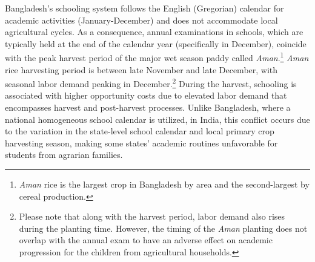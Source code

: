 \documentclass[12pt,letterpaper]{article}
\newcommand{\0}{\ensuremath{\mbox{\boldmath $0$}}}
\begin{document}
Bangladesh's schooling system follows the English (Gregorian) calendar for academic activities (January-December) and does not accommodate local agricultural cycles. As a consequence, annual examinations in schools, which are typically held at the end of the calendar year (specifically in December), coincide with the peak harvest period of the major wet season paddy called \textit{Aman}.\footnote{\textit{Aman} rice is the largest crop in Bangladesh by area and the second-largest by cereal production.} \textit{Aman} rice harvesting period is between late November and late December, with seasonal labor demand peaking in December.\footnote{Please note that along with the harvest period, labor demand also rises during the planting time. However, the timing of the \textit{Aman} planting does not overlap with the annual exam to have an adverse effect on academic progression for the children from agricultural households.} During the harvest, schooling is associated with higher opportunity costs due to elevated labor demand that encompasses harvest and post-harvest processes. Unlike Bangladesh, where a national homogeneous school calendar is utilized, in India, this conflict occurs due to the variation in the state-level school calendar and local primary crop harvesting season, making some states' academic routines unfavorable for students from agrarian families. 
\end{document}
